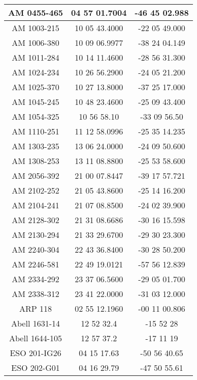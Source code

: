 \begin{apendicesenv}
\begin{longtable}{|c|c|c|}
            AM 0455-465 & 04 57 01.7004 & -46 45 02.988 \\ \hline
            AM 1003-215 & 10 05 43.4000 & -22 05 49.000 \\ \hline
            AM 1006-380 & 10 09 06.9977 & -38 24 04.149 \\ \hline
            AM 1011-284 & 10 14 11.4600 & -28 56 31.300 \\ \hline
            AM 1024-234 & 10 26 56.2900 & -24 05 21.200 \\ \hline
            AM 1025-370 & 10 27 13.8000 & -37 25 17.000 \\ \hline
            AM 1045-245 & 10 48 23.4600 & -25 09 43.400 \\ \hline
            AM 1054-325 & 10 56 58.10 & -33 09 56.50 \\ \hline
            AM 1110-251 & 11 12 58.0996 & -25 35 14.235 \\ \hline
            AM 1303-235 & 13 06 24.0000 & -24 09 50.600 \\ \hline
            AM 1308-253 & 13 11 08.8800 & -25 53 58.600 \\ \hline
            AM 2056-392 & 21 00 07.8447 & -39 17 57.721 \\ \hline
            AM 2102-252 & 21 05 43.8600 & -25 14 16.200 \\ \hline
            AM 2104-241 & 21 07 08.8500 & -24 02 39.900 \\ \hline
            AM 2128-302 & 21 31 08.6686 & -30 16 15.598 \\ \hline
            AM 2130-294 & 21 33 29.6700 & -29 30 23.300 \\ \hline
            AM 2240-304 & 22 43 36.8400 & -30 28 50.200 \\ \hline
            AM 2246-581 & 22 49 19.0121 & -57 56 12.839 \\ \hline
            AM 2334-292 & 23 37 06.5600 & -29 05 01.700 \\ \hline
            AM 2338-312 & 23 41 22.0000 & -31 03 12.000 \\ \hline
            ARP 118 & 02 55 12.1960 & -00 11 00.806 \\ \hline
            Abell 1631-14 & 12 52 32.4 & -15 52 28 \\ \hline
            Abell 1644-105 & 12 57 37.2 & -17 11 19 \\ \hline
            ESO 201-IG26 & 04 15 17.63 & -50 56 40.65 \\ \hline
            ESO 202-G01 & 04 16 29.79 & -47 50 55.61 \\ \hline

\end{longtable}
\end{apendicesenv}
